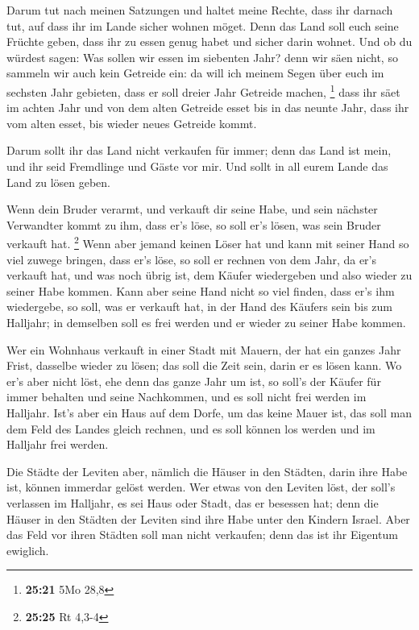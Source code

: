  Darum tut nach meinen Satzungen und haltet meine Rechte,
dass ihr darnach tut, auf dass ihr im Lande sicher wohnen möget.
 Denn das Land soll euch seine Früchte geben, dass ihr zu
essen genug habet und sicher darin wohnet.  Und ob du
würdest sagen: Was sollen wir essen im siebenten Jahr? denn wir säen
nicht, so sammeln wir auch kein Getreide ein:  da will
ich meinem Segen über euch im sechsten Jahr gebieten, dass er soll
dreier Jahr Getreide machen, \footnote{\textbf{25:21} 5Mo 28,8}
 dass ihr säet im achten Jahr und von dem alten Getreide
esset bis in das neunte Jahr, dass ihr vom alten esset, bis wieder neues
Getreide kommt.

 Darum sollt ihr das Land nicht verkaufen für immer; denn
das Land ist mein, und ihr seid Fremdlinge und Gäste vor mir.
 Und sollt in all eurem Lande das Land zu lösen geben.

 Wenn dein Bruder verarmt, und verkauft dir seine Habe,
und sein nächster Verwandter kommt zu ihm, dass er's löse, so soll er's
lösen, was sein Bruder verkauft hat. \footnote{\textbf{25:25} Rt 4,3-4}
 Wenn aber jemand keinen Löser hat und kann mit seiner
Hand so viel zuwege bringen, dass er's löse,  so soll er
rechnen von dem Jahr, da er's verkauft hat, und was noch übrig ist, dem
Käufer wiedergeben und also wieder zu seiner Habe kommen.
 Kann aber seine Hand nicht so viel finden, dass er's ihm
wiedergebe, so soll, was er verkauft hat, in der Hand des Käufers sein
bis zum Halljahr; in demselben soll es frei werden und er wieder zu
seiner Habe kommen.

 Wer ein Wohnhaus verkauft in einer Stadt mit Mauern, der
hat ein ganzes Jahr Frist, dasselbe wieder zu lösen; das soll die Zeit
sein, darin er es lösen kann.  Wo er's aber nicht löst,
ehe denn das ganze Jahr um ist, so soll's der Käufer für immer behalten
und seine Nachkommen, und es soll nicht frei werden im Halljahr.
 Ist's aber ein Haus auf dem Dorfe, um das keine Mauer
ist, das soll man dem Feld des Landes gleich rechnen, und es soll können
los werden und im Halljahr frei werden.

 Die Städte der Leviten aber, nämlich die Häuser in den
Städten, darin ihre Habe ist, können immerdar gelöst werden.
 Wer etwas von den Leviten löst, der soll's verlassen im
Halljahr, es sei Haus oder Stadt, das er besessen hat; denn die Häuser
in den Städten der Leviten sind ihre Habe unter den Kindern Israel.
 Aber das Feld vor ihren Städten soll man nicht
verkaufen; denn das ist ihr Eigentum ewiglich.

